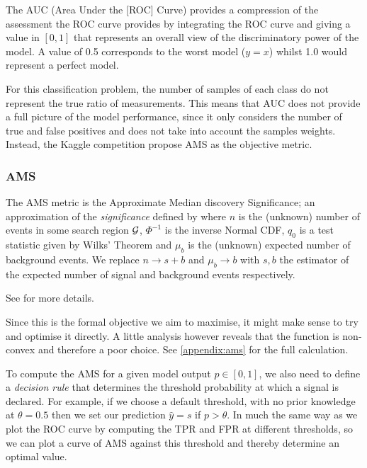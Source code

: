 The AUC (Area Under the [ROC] Curve) provides a compression of the assessment the ROC curve provides by integrating the ROC curve and giving a value in $[0,1]$ that represents an overall view of the discriminatory power of the model. A value of 0.5 corresponds to the worst model ($y=x$) whilst 1.0 would represent a perfect model. 

For this classification problem, the number of samples of each class do not represent the true ratio of measurements. This means that AUC does not provide a full picture of the model performance, since it only considers the number of true and false positives and does not take into account the samples weights. Instead, the Kaggle competition propose AMS as the objective metric.

\subsubsection{AMS}
The AMS metric is the Approximate Median discovery Significance;  an approximation of the \emph{significance} defined by 
where $n$ is the (unknown) number of events in some search region $\mathcal{G}$, $\Phi^{-1}$ is the inverse Normal CDF, $q_0$ is a test statistic given by Wilks' Theorem and $\mu_b$ is the (unknown) expected number of background events. We replace $n\rightarrow s+b$ and $\mu_b\rightarrow b$ with $s,b$ the estimator of the expected number of signal and background events respectively.

See \cite{HiggsML} for more details.

Since this is the formal objective we aim to maximise, it might make sense to try and optimise it directly. A little analysis however reveals that the function is non-convex and therefore a poor choice. See \ref{appendix:ams} for the full calculation.

To compute the AMS for a given model output $p \in [0,1]$, we also need to define a \emph{decision rule} that determines the threshold probability at which a signal is declared. For example, if we choose a default threshold, with no prior knowledge at $\theta = 0.5$ then we set our prediction $\hat{y} = s$ if $p > \theta$. In much the same way as we plot the ROC curve by computing the TPR and FPR at different thresholds, so we can plot a curve of AMS against this threshold and thereby determine an optimal value. 

